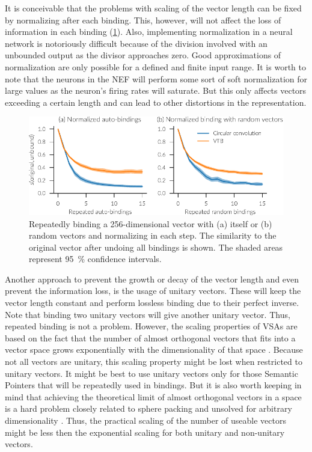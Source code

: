 It is conceivable that the problems with scaling of the vector length can be fixed by normalizing after each binding.
This, however, will not affect the loss of information in each binding (\cref{fig:bindings-normalized}).
Also, implementing normalization in a neural network is notoriously difficult because of the division involved with an unbounded output as the divisor approaches zero.
Good approximations of normalization are only possible for a defined and finite input range.
It is worth to note that the neurons in the NEF will perform some sort of soft normalization for large values as the neuron's firing rates will saturate.
But this only affects vectors exceeding a certain length and can lead to other distortions in the representation.
\begin{figure}
    \centering
    \includegraphics{figures/bindings-normalized}
    \caption[Repeatedly binding a 256-dimensional vector with normalization]{Repeatedly binding a 256-dimensional vector with (a) itself or (b) random vectors and normalizing in each step. The similarity to the original vector after undoing all bindings is shown. The shaded areas represent \SI{95}{\percent} confidence intervals.}\label{fig:bindings-normalized}
\end{figure}

Another approach to prevent the growth or decay of the vector length and even prevent the information loss, is the usage of unitary vectors.
These will keep the vector length constant and perform lossless binding due to their perfect inverse.
Note that binding two unitary vectors will give another unitary vector.
Thus, repeated binding is not a problem.
However, the scaling properties of VSAs are based on the fact that the number of almost orthogonal vectors that fits into a vector space grows exponentially with the dimensionality of that space \parencite{wyner1967,cai2013}.
Because not all vectors are unitary, this scaling property might be lost when restricted to unitary vectors.
It might be best to use unitary vectors only for those Semantic Pointers that will be repeatedly used in bindings.
But it is also worth keeping in mind that achieving the theoretical limit of almost orthogonal vectors in a space is a hard problem closely related to sphere packing and unsolved for arbitrary dimensionality \parencite{cohn2017}.
Thus, the practical scaling of the number of useable vectors might be less then the exponential scaling for both unitary and non-unitary vectors.

